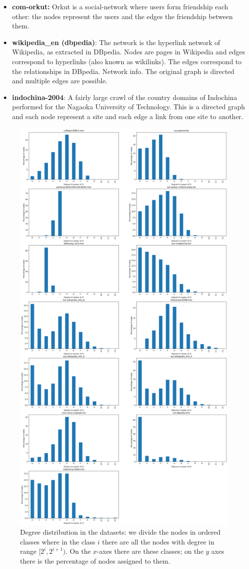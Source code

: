 \begin{itemize}
	\item \textbf{com-orkut:} Orkut is a social-network where users form friendship each other: the nodes represent the users and the edges the friendship between them.
	\item \textbf{wikipedia\_en (dbpedia)}: The network is the hyperlink network of Wikipedia, as extracted in DBpedia. Nodes are pages in Wikipedia and edges correspond to hyperlinks (also known as wikilinks). The edges correspond to the relationships in DBpedia.
	Network info. The original graph is directed and multiple edges are possible.
	\item \textbf{indochina-2004}: A fairly large crawl of the country domains of Indochina performed for the Nagaoka University of Technology. This is a directed graph and each node represent a site and each edge a link from one site to another.
\end{itemize}

\begin{figure}
	\centering
	\includegraphics[width=0.75\linewidth]{0-resources/dataset-degree-distribution.png}
	\caption{Degree distribution in the datasets: we divide the nodes in ordered classes where in the class $i$ there are all the nodes with degree in range $[2^i, 2^{i+1})$. On the $x$-axes there are these classes; on the $y$ axes there is the percentage of nodes assigned to them.}
	\label{fig:dataset-degree-distribution}
\end{figure}
\newpage
